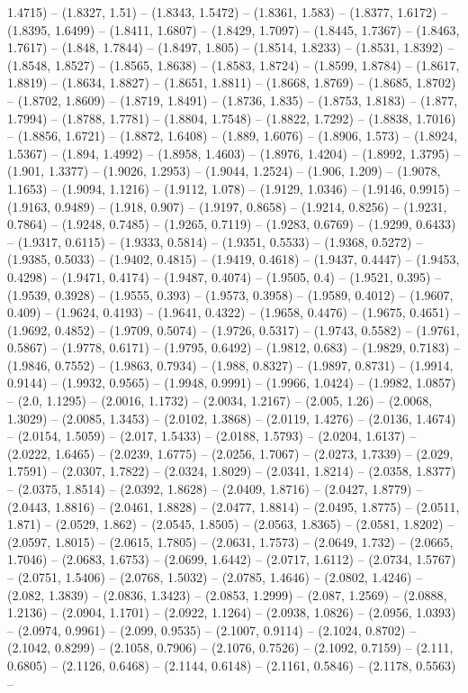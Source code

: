 1.4715) -- (1.8327, 1.51) -- (1.8343, 1.5472) -- (1.8361, 1.583) -- (1.8377, 1.6172) -- (1.8395, 1.6499) -- (1.8411, 1.6807) -- (1.8429, 1.7097) -- (1.8445, 1.7367) -- (1.8463, 1.7617) -- (1.848, 1.7844) -- (1.8497, 1.805) -- (1.8514, 1.8233) -- (1.8531, 1.8392) -- (1.8548, 1.8527) -- (1.8565, 1.8638) -- (1.8583, 1.8724) -- (1.8599, 1.8784) -- (1.8617, 1.8819) -- (1.8634, 1.8827) -- (1.8651, 1.8811) -- (1.8668, 1.8769) -- (1.8685, 1.8702) -- (1.8702, 1.8609) -- (1.8719, 1.8491) -- (1.8736, 1.835) -- (1.8753, 1.8183) -- (1.877, 1.7994) -- (1.8788, 1.7781) -- (1.8804, 1.7548) -- (1.8822, 1.7292) -- (1.8838, 1.7016) -- (1.8856, 1.6721) -- (1.8872, 1.6408) -- (1.889, 1.6076) -- (1.8906, 1.573) -- (1.8924, 1.5367) -- (1.894, 1.4992) -- (1.8958, 1.4603) -- (1.8976, 1.4204) -- (1.8992, 1.3795) -- (1.901, 1.3377) -- (1.9026, 1.2953) -- (1.9044, 1.2524) -- (1.906, 1.209) -- (1.9078, 1.1653) -- (1.9094, 1.1216) -- (1.9112, 1.078) -- (1.9129, 1.0346) -- (1.9146, 0.9915) -- (1.9163, 0.9489) -- (1.918, 0.907) -- (1.9197, 0.8658) -- (1.9214, 0.8256) -- (1.9231, 0.7864) -- (1.9248, 0.7485) -- (1.9265, 0.7119) -- (1.9283, 0.6769) -- (1.9299, 0.6433) -- (1.9317, 0.6115) -- (1.9333, 0.5814) -- (1.9351, 0.5533) -- (1.9368, 0.5272) -- (1.9385, 0.5033) -- (1.9402, 0.4815) -- (1.9419, 0.4618) -- (1.9437, 0.4447) -- (1.9453, 0.4298) -- (1.9471, 0.4174) -- (1.9487, 0.4074) -- (1.9505, 0.4) -- (1.9521, 0.395) -- (1.9539, 0.3928) -- (1.9555, 0.393) -- (1.9573, 0.3958) -- (1.9589, 0.4012) -- (1.9607, 0.409) -- (1.9624, 0.4193) -- (1.9641, 0.4322) -- (1.9658, 0.4476) -- (1.9675, 0.4651) -- (1.9692, 0.4852) -- (1.9709, 0.5074) -- (1.9726, 0.5317) -- (1.9743, 0.5582) -- (1.9761, 0.5867) -- (1.9778, 0.6171) -- (1.9795, 0.6492) -- (1.9812, 0.683) -- (1.9829, 0.7183) -- (1.9846, 0.7552) -- (1.9863, 0.7934) -- (1.988, 0.8327) -- (1.9897, 0.8731) -- (1.9914, 0.9144) -- (1.9932, 0.9565) -- (1.9948, 0.9991) -- (1.9966, 1.0424) -- (1.9982, 1.0857) -- (2.0, 1.1295) -- (2.0016, 1.1732) -- (2.0034, 1.2167) -- (2.005, 1.26) -- (2.0068, 1.3029) -- (2.0085, 1.3453) -- (2.0102, 1.3868) -- (2.0119, 1.4276) -- (2.0136, 1.4674) -- (2.0154, 1.5059) -- (2.017, 1.5433) -- (2.0188, 1.5793) -- (2.0204, 1.6137) -- (2.0222, 1.6465) -- (2.0239, 1.6775) -- (2.0256, 1.7067) -- (2.0273, 1.7339) -- (2.029, 1.7591) -- (2.0307, 1.7822) -- (2.0324, 1.8029) -- (2.0341, 1.8214) -- (2.0358, 1.8377) -- (2.0375, 1.8514) -- (2.0392, 1.8628) -- (2.0409, 1.8716) -- (2.0427, 1.8779) -- (2.0443, 1.8816) -- (2.0461, 1.8828) -- (2.0477, 1.8814) -- (2.0495, 1.8775) -- (2.0511, 1.871) -- (2.0529, 1.862) -- (2.0545, 1.8505) -- (2.0563, 1.8365) -- (2.0581, 1.8202) -- (2.0597, 1.8015) -- (2.0615, 1.7805) -- (2.0631, 1.7573) -- (2.0649, 1.732) -- (2.0665, 1.7046) -- (2.0683, 1.6753) -- (2.0699, 1.6442) -- (2.0717, 1.6112) -- (2.0734, 1.5767) -- (2.0751, 1.5406) -- (2.0768, 1.5032) -- (2.0785, 1.4646) -- (2.0802, 1.4246) -- (2.082, 1.3839) -- (2.0836, 1.3423) -- (2.0853, 1.2999) -- (2.087, 1.2569) -- (2.0888, 1.2136) -- (2.0904, 1.1701) -- (2.0922, 1.1264) -- (2.0938, 1.0826) -- (2.0956, 1.0393) -- (2.0974, 0.9961) -- (2.099, 0.9535) -- (2.1007, 0.9114) -- (2.1024, 0.8702) -- (2.1042, 0.8299) -- (2.1058, 0.7906) -- (2.1076, 0.7526) -- (2.1092, 0.7159) -- (2.111, 0.6805) -- (2.1126, 0.6468) -- (2.1144, 0.6148) -- (2.1161, 0.5846) -- (2.1178, 0.5563) -- 